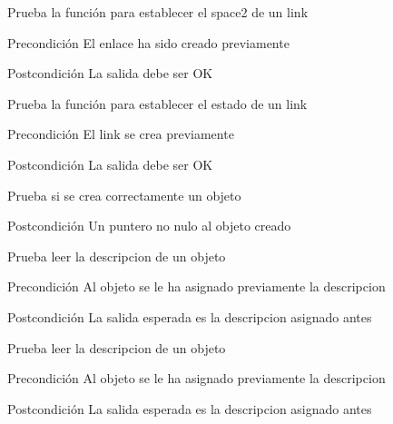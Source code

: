 \begin{DoxyRefList}
\item[\label{test__test000138}%
\hypertarget{test__test000138}{}%
Global \hyperlink{link__test_8c_a1cafd7495574bc7d852c9f4f7eeb14ac}{test1\-\_\-link\-\_\-set\-\_\-space2} ()]Prueba la función para establecer el space2 de un link \begin{DoxyPrecond}{Precondición}
El enlace ha sido creado previamente 
\end{DoxyPrecond}
\begin{DoxyPostcond}{Postcondición}
La salida debe ser O\-K  
\end{DoxyPostcond}

\item[\label{test__test000141}%
\hypertarget{test__test000141}{}%
Global \hyperlink{link__test_8c_a3d7c6730fafe41ed550f32cf890a3549}{test1\-\_\-link\-\_\-set\-\_\-state} ()]Prueba la función para establecer el estado de un link \begin{DoxyPrecond}{Precondición}
El link se crea previamente 
\end{DoxyPrecond}
\begin{DoxyPostcond}{Postcondición}
La salida debe ser O\-K  
\end{DoxyPostcond}

\item[\label{test__test000158}%
\hypertarget{test__test000158}{}%
Global \hyperlink{object__test_8c_a3836d69f92ce7149d56bafcaec83f516}{test1\-\_\-object\-\_\-create} ()]Prueba si se crea correctamente un objeto \begin{DoxyPostcond}{Postcondición}
Un puntero no nulo al objeto creado  
\end{DoxyPostcond}

\item[\label{test__test000187}%
\hypertarget{test__test000187}{}%
Global \hyperlink{object__test_8c_ade15ed0bf4be56983f51a9e0f20fd1ce}{test1\-\_\-object\-\_\-\-Get\-\_\-\-Description} ()]Prueba leer la descripcion de un objeto \begin{DoxyPrecond}{Precondición}
Al objeto se le ha asignado previamente la descripcion 
\end{DoxyPrecond}
\begin{DoxyPostcond}{Postcondición}
La salida esperada es la descripcion asignado antes  
\end{DoxyPostcond}

\item[\label{test__test000189}%
\hypertarget{test__test000189}{}%
Global \hyperlink{object__test_8c_a38c5ec06b44924aa68c90ecce5f9f6e4}{test1\-\_\-object\-\_\-\-Get\-\_\-\-Description2} ()]Prueba leer la descripcion de un objeto \begin{DoxyPrecond}{Precondición}
Al objeto se le ha asignado previamente la descripcion 
\end{DoxyPrecond}
\begin{DoxyPostcond}{Postcondición}
La salida esperada es la descripcion asignado antes  
\end{DoxyPostcond}


\end{DoxyRefList}
